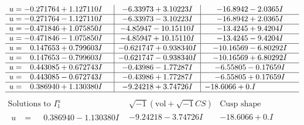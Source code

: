\documentclass[1p]{elsarticle_modified}
\theoremstyle{definition}
\newcommand{\I}{\sqrt{-1}}
\begin{document}
$$\begin{array}{c|c|c}
\begin{aligned}
u &= -0.271764 + 1.127110 I\end{aligned}
 & -6.33973 + 3.10223 I & -16.8942 - 2.0365 I \\ \hline\begin{aligned}
u &= -0.271764 - 1.127110 I\end{aligned}
 & -6.33973 - 3.10223 I & -16.8942 + 2.0365 I \\ \hline\begin{aligned}
u &= -0.471846 + 1.075850 I\end{aligned}
 & -4.85947 - 10.15110 I & -13.4245 + 9.4204 I \\ \hline\begin{aligned}
u &= -0.471846 - 1.075850 I\end{aligned}
 & -4.85947 + 10.15110 I & -13.4245 - 9.4204 I \\ \hline\begin{aligned}
u &= \phantom{-}0.147653 + 0.799603 I\end{aligned}
 & -0.621747 + 0.938340 I & -10.16569 - 6.80292 I \\ \hline\begin{aligned}
u &= \phantom{-}0.147653 - 0.799603 I\end{aligned}
 & -0.621747 - 0.938340 I & -10.16569 + 6.80292 I \\ \hline\begin{aligned}
u &= \phantom{-}0.443085 + 0.672743 I\end{aligned}
 & -0.43986 - 1.77287 I & -6.55805 - 0.17659 I \\ \hline\begin{aligned}
u &= \phantom{-}0.443085 - 0.672743 I\end{aligned}
 & -0.43986 + 1.77287 I & -6.55805 + 0.17659 I \\ \hline\begin{aligned}
u &= \phantom{-}0.386940 + 1.130380 I\end{aligned}
 & -9.24218 + 3.74726 I & -18.6066 + 0. I\phantom{ +0.000000I}\\
 \hline 
 \end{array}$$\newpage$$\begin{array}{c|c|c}  
\text{Solutions to }I^u_{1}& \I (\text{vol} + \sqrt{-1}CS) & \text{Cusp shape}\\
 \hline 
\begin{aligned}
u &= \phantom{-}0.386940 - 1.130380 I\end{aligned}
 & -9.24218 - 3.74726 I & -18.6066 + 0. I\phantom{ +0.000000I} \\ \hline\begin{aligned}

\end{aligned}
\end{array}$$
\end{document}
